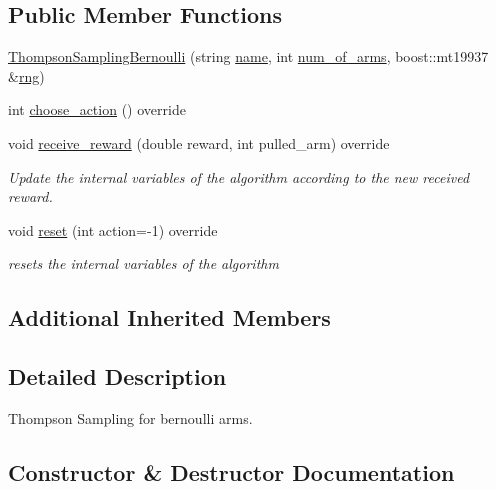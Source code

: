 \subsection*{Public Member Functions}
\begin{DoxyCompactItemize}
\item 
\mbox{\hyperlink{class_thompson_sampling_bernoulli_a22ed8548767e2910edc5e9ad6c13334f}{Thompson\+Sampling\+Bernoulli}} (string \mbox{\hyperlink{class_m_a_b_algorithm_a77b10ecc4b49d519c557f65358167b82}{name}}, int \mbox{\hyperlink{class_m_a_b_algorithm_a340fa9e83e85b092f2c6125fc4e8549b}{num\+\_\+of\+\_\+arms}}, boost\+::mt19937 \&\mbox{\hyperlink{class_thompson_sampling_a1b66efa9bb0912df92975147f8923216}{rng}})
\item 
int \mbox{\hyperlink{class_thompson_sampling_bernoulli_a80f2f22f0bbf71b60a7a7133ce49d917}{choose\+\_\+action}} () override
\item 
void \mbox{\hyperlink{class_thompson_sampling_bernoulli_a02d2aabd642f0b1149963539178f2a1e}{receive\+\_\+reward}} (double reward, int pulled\+\_\+arm) override
\begin{DoxyCompactList}\small\item\em Update the internal variables of the algorithm according to the new received reward. \end{DoxyCompactList}\item 
void \mbox{\hyperlink{class_thompson_sampling_bernoulli_abb2e2c252333090ac1bd63e4297e99ba}{reset}} (int action=-\/1) override
\begin{DoxyCompactList}\small\item\em resets the internal variables of the algorithm \end{DoxyCompactList}\end{DoxyCompactItemize}
\subsection*{Additional Inherited Members}


\subsection{Detailed Description}
Thompson Sampling for bernoulli arms. 

\subsection{Constructor \& Destructor Documentation}
\mbox{\label{class_thompson_sampling_bernoulli_a22ed8548767e2910edc5e9ad6c13334f}} 
